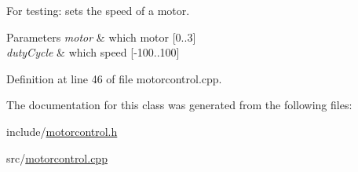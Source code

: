 \-For testing\-: sets the speed of a motor. 


\begin{DoxyParams}{\-Parameters}
{\em motor} & which motor \mbox{[}0..3\mbox{]} \\
\hline
{\em duty\-Cycle} & which speed \mbox{[}-\/100..100\mbox{]} \\
\hline
\end{DoxyParams}


\-Definition at line 46 of file motorcontrol.\-cpp.



\-The documentation for this class was generated from the following files\-:\begin{DoxyCompactItemize}
\item 
include/\hyperlink{motorcontrol_8h}{motorcontrol.\-h}\item 
src/\hyperlink{motorcontrol_8cpp}{motorcontrol.\-cpp}\end{DoxyCompactItemize}
